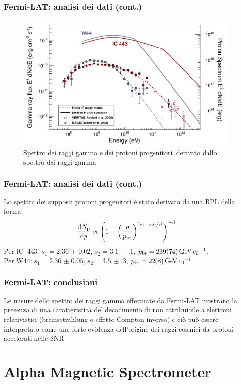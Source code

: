 \documentclass[10pt]{beamer}
\newcommand*{\dd}{\mathop{}\!\textup{d}} %
\newcommand*{\toder}[3][]{\frac{{\dd^{#1}}#2}{\dd {#3}^{#1}}}
\begin{document}
\begin{frame}
  \frametitle{Fermi-LAT: analisi dei dati (cont.)}
  \begin{figure}
    \centering
    \includegraphics[width=.8\columnwidth]{1231160fig3}
    \caption{Spettro dei raggi gamma e dei protoni progenitori, derivato dallo
      spettro dei raggi gamma}
  \end{figure}
\end{frame}

\begin{frame}
  \frametitle{Fermi-LAT: analisi dei dati (cont.)}
  Lo spettro dei supposti protoni progenitori è stato derivato da una BPL della
  forma
  \begin{equation*}
    \toder{N_{\textup{p}}}{p} \propto
    \left(
      1 +
      \left(
        \frac{p}{p_{\textup{br}}}
      \right)^{(s_{1} - s_{2})/\beta}
    \right)^{-\beta}
  \end{equation*}
  Per IC~443: $s_{1} = \num{2.36(2)}$, $s_{2} = \num{3.1(1)}$,
  $p_{\textup{br}} = \SI{239(74)}{\giga \electronvolt \per \clight}$.  \\
  Per W44: $s_{1} = \num{2.36(5)}$, $s_{2} = \num{3.5(3)}$,
  $p_{\textup{br}} = \SI{22(8)}{\giga \electronvolt \per \clight}$.
\end{frame}

\begin{frame}
  \frametitle{Fermi-LAT: conclusioni}
  Le misure dello spettro dei raggi gamma effettuate da Fermi-LAT mostrano la
  presenza di una \alert{caratteristica del decadimento di \PGpz} non
  attribuibile a elettroni relativistici (bremsstrahlung o effetto Compton
  inverso) e ciò può essere interpretato come una forte
  \alert{evidenza dell'origine dei raggi cosmici da protoni accelerati} nelle
  SNR
\end{frame}

\section[AMS-02]{Alpha Magnetic Spectrometer}
\end{document}
